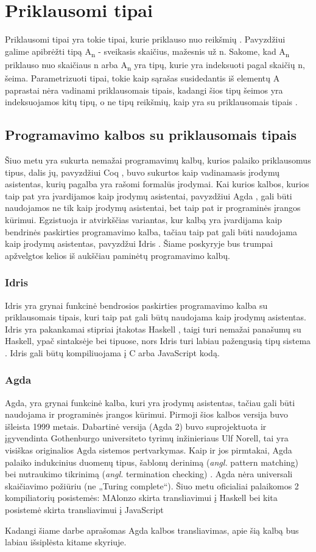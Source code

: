 \documentclass{VUMIFPSkursinis}
\begin{document}
\section{Priklausomi tipai}
Priklausomi tipai yra tokie tipai, kurie priklauso nuo reikšmių \cite{depentantTypesAtWork}. Pavyzdžiui galime apibrėžti tipą A\textsubscript{n} - sveikasis skaičius, mažesnis už n. Sakome, kad A\textsubscript{n} priklauso nuo skaičiaus n arba A\textsubscript{n} yra tipų, kurie yra indeksuoti pagal skaičių n, šeima. Parametrizuoti tipai, tokie kaip sąrašas susidedantis iš elementų A paprastai nėra vadinami priklausomais tipais, kadangi šios tipų šeimos yra indeksuojamos kitų tipų, o ne tipų reikšmių, kaip yra su priklausomais tipais \cite{depentantTypesAtWork}.
\subsection{Programavimo kalbos su priklausomais tipais}
Šiuo metu yra sukurta nemažai programavimų kalbų, kurios palaiko priklausomus tipus, dalis jų, pavyzdžiui Coq \cite{coq}, buvo sukurtos kaip vadinamasis įrodymų asistentas, kurių pagalba yra rašomi formalūs įrodymai. Kai kurios kalbos, kurios taip pat yra įvardijamos kaip įrodymų asistentai, pavyzdžiui Agda \cite{agda_book}, gali būti naudojamos ne tik kaip įrodymų asistentai, bet taip pat ir programinės įrangos kūrimui. Egzistuoja ir atvirkščias variantas, kur kalbą yra įvardijama kaip bendrinės paskirties programavimo kalba, tačiau taip pat gali būti naudojama kaip įrodymų asistentas, pavyzdžui Idris \cite{idris}. Šiame poskyryje bus trumpai apžvelgtos kelios iš aukščiau paminėtų programavimo kalbų.
\subsubsection{Idris}
Idris yra grynai funkcinė bendrosios paskirties programavimo kalba su priklausomais tipais, kuri taip pat gali būtų naudojama kaip įrodymų asistentas. Idris yra pakankamai stipriai įtakotas Haskell \cite{haskell}, taigi turi nemažai panašumų su Haskell, ypač sintaksėje bei tipuose, nors Idris turi labiau pažengusią tipų sistema \cite{idris}. Idris gali būtų kompiliuojama į C arba JavaScript kodą.
\subsubsection{Agda}
Agda, yra grynai funkcinė kalba, kuri yra įrodymų asistentas, tačiau gali būti naudojama ir programinės įrangos kūrimui. Pirmoji šios kalbos versija buvo išleista 1999 metais. Dabartinė versija (Agda 2) buvo suprojektuota ir įgyvendinta Gothenburgo universiteto tyrimų inžinieriaus Ulf Norell, tai yra visiškas originalios Agda sistemos pertvarkymas. Kaip ir jos pirmtakai, Agda palaiko indukcinius duomenų tipus, šablonų derinimą (\textit{angl.} pattern matching) bei nutraukimo tikrinimą (\textit{angl.} termination checking) \cite{agda_overview}. Agda nėra universali skaičiavimo požiūriu (ne „Turing complete“). Šiuo metu oficialiai palaikomos 2 kompiliatorių posistemės: MAlonzo skirta transliavimui į Haskell bei kita posistemė skirta transliavimui į JavaScript \par Kadangi šiame darbe aprašomas Agda kalbos transliavimas, apie šią kalbą bus labiau išsiplėsta kitame skyriuje.
\end{document}
